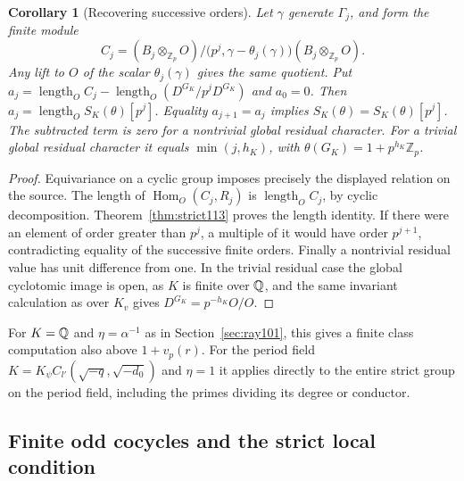 \documentclass[a4paper,11pt]{article}
\newtheorem{corollary}[proposition]{Corollary}
\theoremstyle{definition}
\theoremstyle{remark}
\newcommand{\ZZ}{\mathbb Z}\newcommand{\ord}{\operatorname{ord}}
\newcommand{\len}{\operatorname{length}}\newcommand{\Res}{\operatorname*{Res}}
\numberwithin{equation}{section}
\begin{document}
\begin{corollary}[Recovering successive orders]\label{cor:levels113}
Let \(\gamma\) generate \(\Gamma_j\), and form the finite module
\[
 C_j=(B_j\otimes_{\ZZ_p}O)/
       \bigl(p^j,\gamma-\theta_j(\gamma)\bigr)(B_j\otimes_{\ZZ_p}O).
\]
Any lift to \(O\) of the scalar \(\theta_j(\gamma)\) gives the same
quotient. Put \(a_j=\len_O C_j-\len_O(D^{G_K}/p^jD^{G_K})\)
and \(a_0=0\). Then \(a_j=\len_O S_K(\theta)[p^j]\). Equality
\(a_{j+1}=a_j\) implies \(S_K(\theta)=S_K(\theta)[p^j]\).
The subtracted term is zero for a nontrivial global residual
character. For a trivial global residual character it equals
\(\min(j,h_K)\), with \(\theta(G_K)=1+p^{h_K}\ZZ_p\).
\end{corollary}
\begin{proof}
Equivariance on a cyclic group imposes precisely the displayed
relation on the source. The length of
\(\operatorname{Hom}_O(C_j,R_j)\) is \(\len_O C_j\), by cyclic
decomposition. Theorem~\ref{thm:strict113} proves the length
identity. If there were an element of order greater than \(p^j\),
a multiple of it would have order \(p^{j+1}\), contradicting
equality of the successive finite orders. Finally a nontrivial
residual value has unit difference from one. In the trivial
residual case the global cyclotomic image is open, as \(K\) is
finite over \(\mathbb Q\), and the same invariant calculation as over
\(K_v\) gives \(D^{G_K}=p^{-h_K}O/O\).
\end{proof}

For \(K=\mathbb Q\) and \(\eta=\alpha^{-1}\) as in
Section~\ref{sec:ray101}, this gives a finite class computation
also above \(1+v_p(r)\). For the period field \(K=K_\psi C_{l'}(\sqrt{-q},\sqrt{-d_0})\)
and \(\eta=1\) it applies
directly to the entire strict group on the period field, including
the primes dividing its degree or conductor.


\subsection{Finite odd cocycles and the strict local condition}
\label{sec:oddcocycles675}
\end{document}
